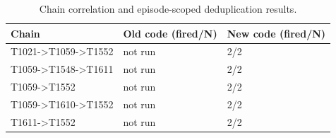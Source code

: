 \begin{table}[t]
\centering
\caption{Chain correlation and episode-scoped deduplication results.}
\label{tab:chain-dedup}
\begin{tabular}{lll}
\toprule
Chain & Old code (fired/N) & New code (fired/N) \\
\midrule
T1021->T1059->T1552 & not run & 2/2 \\
T1059->T1548->T1611 & not run & 2/2 \\
T1059->T1552 & not run & 2/2 \\
T1059->T1610->T1552 & not run & 2/2 \\
T1611->T1552 & not run & 2/2 \\
\bottomrule
\end{tabular}
\end{table}
